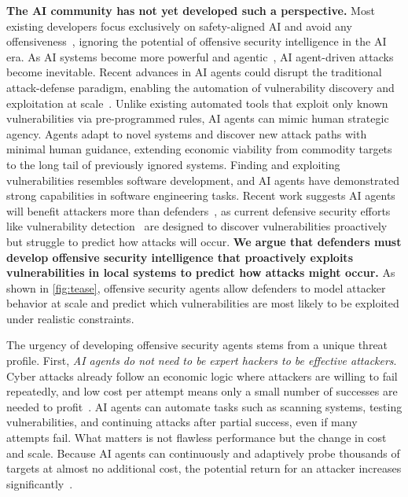 \documentclass{article}
\theoremstyle{plain}
\theoremstyle{definition}
\theoremstyle{remark}
\begin{document}
\textbf{The AI community has not yet developed such a perspective.} Most existing developers focus exclusively on safety-aligned AI and avoid any offensiveness~\citep{bengio2024managing}, ignoring the potential of offensive security intelligence in the AI era. As AI systems become more powerful and agentic~\citep{wang2024survey}, AI agent-driven attacks become inevitable. Recent advances in AI agents could disrupt the traditional attack-defense paradigm, enabling the automation of vulnerability discovery and exploitation at scale~\citep{potter2025frontier}. Unlike existing automated tools that exploit only known vulnerabilities via pre-programmed rules, AI agents can mimic human strategic agency. Agents adapt to novel systems and discover new attack paths with minimal human guidance, extending economic viability from commodity targets to the long tail of previously ignored systems. Finding and exploiting vulnerabilities resembles software development, and AI agents have demonstrated strong capabilities in software engineering tasks. Recent work suggests AI agents will benefit attackers more than defenders~\citep{potter2025frontier,carlini2025llms}, as current defensive security efforts like vulnerability detection~\citep{chakraborty2021deep} are designed to discover vulnerabilities proactively but struggle to predict how attacks will occur. \textbf{We argue that defenders must develop offensive security intelligence that proactively exploits vulnerabilities in local systems to predict how attacks might occur.} As shown in \autoref{fig:tease}, offensive security agents allow defenders to model attacker behavior at scale and predict which vulnerabilities are most likely to be exploited under realistic constraints.

The urgency of developing offensive security agents stems from a unique threat profile. First, \textit{AI agents do not need to be expert hackers to be effective attackers}. Cyber attacks already follow an economic logic where attackers are willing to fail repeatedly, and low cost per attempt means only a small number of successes are needed to profit~\citep{laszka2017economics,allodi2017economic}. AI agents can automate tasks such as scanning systems, testing vulnerabilities, and continuing attacks after partial success, even if many attempts fail. What matters is not flawless performance but the change in cost and scale. Because AI agents can continuously and adaptively probe thousands of targets at almost no additional cost, the potential return for an attacker increases significantly~\citep{anthropic_espionage}.
\end{document}
